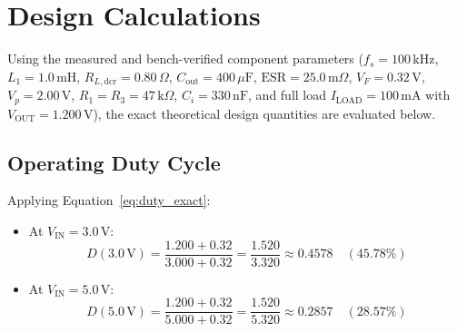 \documentclass[12pt,a4paper]{article}
\newcommand{\Vout}{V_{\mathrm{OUT}}}
\newcommand{\Vin}{V_{\mathrm{IN}}}
\newcommand{\Iload}{I_{\mathrm{LOAD}}}
\newcommand{\fs}{f_s}
\newcommand{\DCR}{R_{L,\mathrm{dcr}}}
\newcommand{\ESR}{\mathrm{ESR}}
\begin{document}
\section{Design Calculations}
\label{sec:calculations}

Using the measured and bench-verified component parameters ($\fs = 100\,\mathrm{kHz}$, $L_1 = 1.0\,\mathrm{mH}$, $\DCR = 0.80\,\Omega$, $C_{\mathrm{out}} = 400\,\mu\mathrm{F}$, $\ESR = 25.0\,\mathrm{m}\Omega$, $V_F = 0.32\,\mathrm{V}$, $V_p = 2.00\,\mathrm{V}$, $R_1 = R_3 = 47\,\mathrm{k}\Omega$, $C_i = 330\,\mathrm{nF}$, and full load $\Iload = 100\,\mathrm{mA}$ with $\Vout = 1.200\,\mathrm{V}$), the exact theoretical design quantities are evaluated below.

\subsection{Operating Duty Cycle}
Applying Equation~\eqref{eq:duty_exact}:
\begin{itemize}
    \item At $\Vin = 3.0\,\mathrm{V}$:
    \begin{equation*}
        D(3.0\,\mathrm{V}) = \frac{1.200 + 0.32}{3.000 + 0.32} = \frac{1.520}{3.320} \approx \mathbf{0.4578} \quad (45.78\%)
    \end{equation*}
    \item At $\Vin = 5.0\,\mathrm{V}$:
    \begin{equation*}
        D(5.0\,\mathrm{V}) = \frac{1.200 + 0.32}{5.000 + 0.32} = \frac{1.520}{5.320} \approx \mathbf{0.2857} \quad (28.57\%)
    \end{equation*}
\end{itemize}
\end{document}
